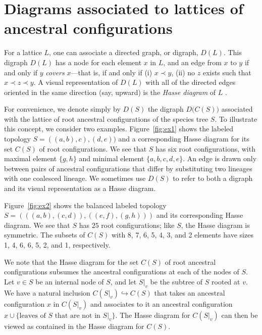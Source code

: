 \documentclass[10pt]{article}
\begin{document}
\section{Diagrams associated to lattices of ancestral configurations}\label{sec:diagrams}

For a lattice $L$, one can associate a directed graph, or digraph, $D(L)$. This digraph $D(L)$ has a node for each element $x$ in $L$, and an edge from $x$ to $y$ if and only if $y$ \emph{covers} $x$---that is, if and only if (i) $x \prec y$, (ii) no $z$ exists such that $x \prec z \prec y$. A visual representation of $D(L)$ with all of the directed edges oriented in the same direction (say, upward) is the \emph{Hasse diagram} of $L$ \citep{gratzer}. 

For convenience, we denote simply by $D(S)$ the digraph $D\big( C(S) \big)$ associated with the lattice of root ancestral configurations of the species tree $S$. To illustrate this concept, we consider two examples. Figure~\ref{fig:ex1} shows the labeled topology $S = ((a,b),c),(d,e))$ and a corresponding Hasse diagram for its set $C(S)$ of root configurations. We see that $S$ has six root configurations, with maximal element $\{g,h\}$ and minimal element $\{a,b,c,d,e\}$. An edge is drawn only between pairs of ancestral configurations that differ by substituting two lineages with one coalesced lineage. We sometimes use $D(S)$ to refer to both a digraph and its visual representation as a Hasse diagram. 

Figure~\ref{fig:ex2} shows the balanced labeled topology $S = (((a,b),(c,d)),((e,f),(g,h)))$ and its corresponding Hasse diagram. We see that $S$ has $25$ root configurations; like $S$, the Hasse diagram is symmetric. The subsets of $C(S)$ with 8, 7, 6, 5, 4, 3, and 2 elements have sizes 
1, 4, 6, 6, 5, 2, and 1, respectively.

We note that the Hasse diagram for the set $C(S)$ of root ancestral configurations subsumes the ancestral configurations at each of the nodes of $S$. Let $v \in S$ be an internal node of $S$, and let $S|_v$ be the subtree of $S$ rooted at $v$. We have a natural inclusion $C(S|_v) \hookrightarrow C(S)$ that takes an ancestral configuration $x$ in $C(S|_v)$ and associates to it an ancestral configuration $x \cup \{\text{leaves of $S$ that are not in $S|_v$}\}$. The Hasse diagram for $C(S|_v)$ can then be viewed as contained in the Hasse diagram for $C(S)$. 
\end{document}
